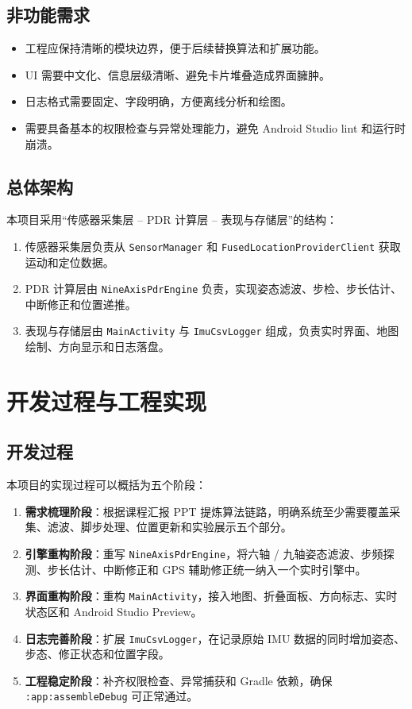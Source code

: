 \documentclass[12pt,a4paper]{ctexart}
\begin{document}
\subsection{非功能需求}
\begin{itemize}
    \item 工程应保持清晰的模块边界，便于后续替换算法和扩展功能。
    \item UI 需要中文化、信息层级清晰、避免卡片堆叠造成界面臃肿。
    \item 日志格式需要固定、字段明确，方便离线分析和绘图。
    \item 需要具备基本的权限检查与异常处理能力，避免 Android Studio lint 和运行时崩溃。
\end{itemize}

\subsection{总体架构}
本项目采用“传感器采集层 -- PDR 计算层 -- 表现与存储层”的结构：

\begin{enumerate}
    \item 传感器采集层负责从 \texttt{SensorManager} 和 \texttt{FusedLocationProviderClient} 获取运动和定位数据。
    \item PDR 计算层由 \texttt{NineAxisPdrEngine} 负责，实现姿态滤波、步检、步长估计、中断修正和位置递推。
    \item 表现与存储层由 \texttt{MainActivity} 与 \texttt{ImuCsvLogger} 组成，负责实时界面、地图绘制、方向显示和日志落盘。
\end{enumerate}

\section{开发过程与工程实现}
\subsection{开发过程}
本项目的实现过程可以概括为五个阶段：

\begin{enumerate}
    \item \textbf{需求梳理阶段}：根据课程汇报 PPT 提炼算法链路，明确系统至少需要覆盖采集、滤波、脚步处理、位置更新和实验展示五个部分。
    \item \textbf{引擎重构阶段}：重写 \texttt{NineAxisPdrEngine}，将六轴 / 九轴姿态滤波、步频探测、步长估计、中断修正和 GPS 辅助修正统一纳入一个实时引擎中。
    \item \textbf{界面重构阶段}：重构 \texttt{MainActivity}，接入地图、折叠面板、方向标志、实时状态区和 Android Studio Preview。
    \item \textbf{日志完善阶段}：扩展 \texttt{ImuCsvLogger}，在记录原始 IMU 数据的同时增加姿态、步态、修正状态和位置字段。
    \item \textbf{工程稳定阶段}：补齐权限检查、异常捕获和 Gradle 依赖，确保 \texttt{:app:assembleDebug} 可正常通过。
\end{enumerate}
\end{document}

